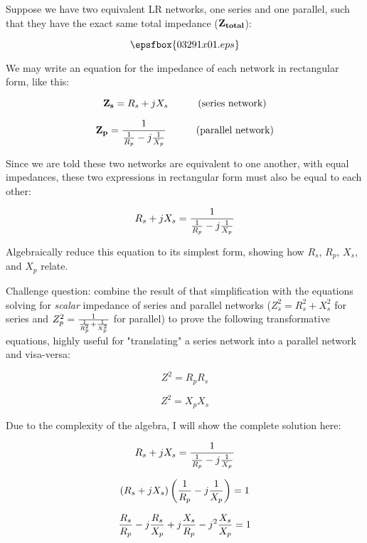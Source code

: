 

Suppose we have two equivalent LR networks, one series and one parallel, such that they have the exact same total impedance (${\bf Z_{total}}$):

$$\epsfbox{03291x01.eps}$$

We may write an equation for the impedance of each network in rectangular form, like this:

$${\bf Z_s} = R_s + jX_s  \hbox{\hskip 30pt (series network)}$$

$${\bf Z_p} = {1 \over {{1 \over R_p} - j{1 \over X_p}}}  \hbox{\hskip 30pt (parallel network)}$$

Since we are told these two networks are equivalent to one another, with equal impedances, these two expressions in rectangular form must also be equal to each other:

$$R_s + jX_s = {1 \over {{1 \over R_p} - j{1 \over X_p}}}$$

Algebraically reduce this equation to its simplest form, showing how $R_s$, $R_p$, $X_s$, and $X_p$ relate.

\vskip 10pt

Challenge question: combine the result of that simplification with the equations solving for {\it scalar} impedance of series and parallel networks ($Z_s^2 = R_s^2 + X_s^2$ for series and $Z_p^2 = {1 \over {{1 \over R_p^2} + {1 \over X_p^2}}}$ for parallel) to prove the following transformative equations, highly useful for "translating" a series network into a parallel network and visa-versa:

$$Z^2 = R_p R_s$$

$$Z^2 = X_p X_s$$







Due to the complexity of the algebra, I will show the complete solution here:

$$R_s + jX_s = {1 \over {{1 \over R_p} - j{1 \over X_p}}}$$

$$\left(R_s + jX_s\right) \left({{1 \over R_p} - j{1 \over X_p}}\right) = 1$$

$${R_s \over R_p} - j{R_s \over X_p} + j{X_s \over R_p} -j^2{X_s \over X_p} = 1$$

